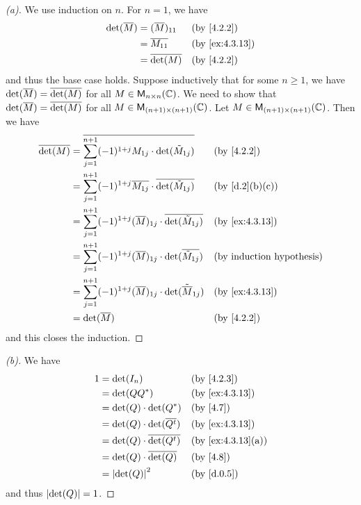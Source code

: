 \begin{proof}[(a)]
  We use induction on \(n\).
  For \(n = 1\), we have
  \begin{align*}
    \det(\conj{M}) & = (\conj{M})_{1 1} &  & \by{4.2.2}     \\
                   & = \conj{M_{1 1}}   &  & \by{ex:4.3.13} \\
                   & = \conj{\det(M)}   &  & \by{4.2.2}
  \end{align*}
  and thus the base case holds.
  Suppose inductively that for some \(n \geq 1\), we have \(\det(\overline{M}) = \overline{\det(M)}\) for all \(M \in \ms[n][n][\C]\).
  We need to show that \(\det(\overline{M}) = \overline{\det(M)}\) for all \(M \in \ms[(n + 1)][(n + 1)][\C]\).
  Let \(M \in \ms[(n + 1)][(n + 1)][\C]\).
  Then we have
  \begin{align*}
    \conj{\det(M)} & = \conj{\sum_{j = 1}^{n + 1} (-1)^{1 + j} M_{1 j} \cdot \det(\tilde{M}_{1 j})}          &  & \by{4.2.2}                       \\
                   & = \sum_{j = 1}^{n + 1} (-1)^{1 + j} \conj{M_{1 j}} \cdot \conj{\det(\tilde{M}_{1 j})}   &  & \by{d.2}[b,c]                    \\
                   & = \sum_{j = 1}^{n + 1} (-1)^{1 + j} (\conj{M})_{1 j} \cdot \conj{\det(\tilde{M}_{1 j})} &  & \by{ex:4.3.13}                   \\
                   & = \sum_{j = 1}^{n + 1} (-1)^{1 + j} (\conj{M})_{1 j} \cdot \det(\conj{\tilde{M}_{1 j}}) &  & \text{(by induction hypothesis)} \\
                   & = \sum_{j = 1}^{n + 1} (-1)^{1 + j} (\conj{M})_{1 j} \cdot \det(\tilde{\conj{M}}_{1 j}) &  & \by{ex:4.3.13}                   \\
                   & = \det(\conj{M})                                                                        &  & \by{4.2.2}
  \end{align*}
  and this closes the induction.
\end{proof}

\begin{proof}[(b)]
  We have
  \begin{align*}
    1 & = \det(I_n)                         &  & \by{4.2.3}        \\
      & = \det(Q Q^*)                       &  & \by{ex:4.3.13}    \\
      & = \det(Q) \cdot \det(Q^*)           &  & \by{4.7}          \\
      & = \det(Q) \cdot \det(\conj{\tp{Q}}) &  & \by{ex:4.3.13}    \\
      & = \det(Q) \cdot \conj{\det(\tp{Q})} &  & \by{ex:4.3.13}[a] \\
      & = \det(Q) \cdot \conj{\det(Q)}      &  & \by{4.8}          \\
      & = \abs{\det(Q)}^2                   &  & \by{d.0.5}
  \end{align*}
  and thus \(\left\lvert\det(Q)\right\rvert = 1\).
\end{proof}

